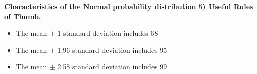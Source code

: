 \documentclass[IntroMain.tex]{subfiles}
\begin{document}
\begin{frame}
	\textbf{Characteristics of the Normal probability distribution}
	\Large
\textbf{5) Useful Rules of Thumb.}

\begin{itemize}
\item	The mean $\pm$  1 standard deviation includes 68%

\item	The mean $\pm$  1.96 standard deviation includes 95%
   
\item 	The mean $\pm$  2.58 standard deviation includes 99%
\end{itemize}

\end{frame}
\end{document}
